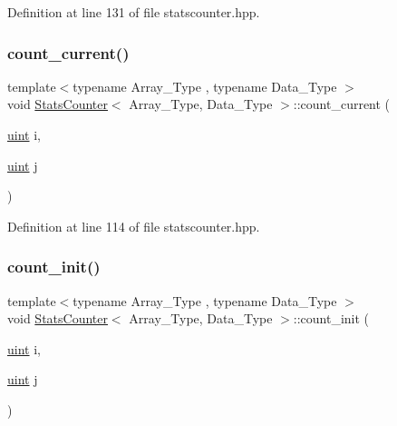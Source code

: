 Definition at line 131 of file statscounter.\+hpp.

\mbox{\label{class_stats_counter_ab81166f7cb67eeaecc469016d237019a}} 
\subsubsection{\texorpdfstring{count\+\_\+current()}{count\_current()}}
{\footnotesize\ttfamily template$<$typename Array\+\_\+\+Type , typename Data\+\_\+\+Type $>$ \\
void \hyperlink{class_stats_counter}{Stats\+Counter}$<$ Array\+\_\+\+Type, Data\+\_\+\+Type $>$\+::count\+\_\+current (\begin{DoxyParamCaption}\item[{\hyperlink{typedefs_8hpp_a91ad9478d81a7aaf2593e8d9c3d06a14}{uint}}]{i,  }\item[{\hyperlink{typedefs_8hpp_a91ad9478d81a7aaf2593e8d9c3d06a14}{uint}}]{j }\end{DoxyParamCaption})\hspace{0.3cm}{\ttfamily [inline]}}



Definition at line 114 of file statscounter.\+hpp.

\mbox{\label{class_stats_counter_a19bd5936619e190c0d8918b4f343922e}} 
\subsubsection{\texorpdfstring{count\+\_\+init()}{count\_init()}}
{\footnotesize\ttfamily template$<$typename Array\+\_\+\+Type , typename Data\+\_\+\+Type $>$ \\
void \hyperlink{class_stats_counter}{Stats\+Counter}$<$ Array\+\_\+\+Type, Data\+\_\+\+Type $>$\+::count\+\_\+init (\begin{DoxyParamCaption}\item[{\hyperlink{typedefs_8hpp_a91ad9478d81a7aaf2593e8d9c3d06a14}{uint}}]{i,  }\item[{\hyperlink{typedefs_8hpp_a91ad9478d81a7aaf2593e8d9c3d06a14}{uint}}]{j }\end{DoxyParamCaption})\hspace{0.3cm}{\ttfamily [inline]}}



